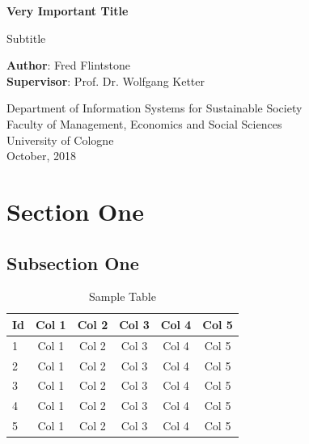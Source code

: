 \documentclass[a4paper]{article}
\begin{document}
\begin{titlepage}
    \begin{center}
        \vspace*{1cm}

        \Large
        \textbf{Very Important Title}

        \vspace{1.5cm}
        Subtitle

        \vspace{8.0cm}

        \large
        \textbf{Author}: Fred Flintstone\\
        \large
        \textbf{Supervisor}: Prof. Dr. Wolfgang Ketter

        \vspace{1cm}
        \large
        Department of Information Systems for Sustainable Society\\
        Faculty of Management, Economics and Social Sciences\\
        University of Cologne\\

        \vspace{1cm}
        October, 2018

    \end{center}
\end{titlepage}

\tableofcontents
\clearpage
\listoffigures
\clearpage
\listoftables
\clearpage


\section{Section One}
\subsection{Subsection One}
\begin{longtable}{l|ccccc}
\caption{Sample Table}
\label{table:table-1}
\\
\hline
\hline
Id & Col 1 & Col 2 & Col 3 & Col 4 & Col 5\\
\hline
1 & Col 1 & Col 2 & Col 3 & Col 4 & Col 5\\
2 & Col 1 & Col 2 & Col 3 & Col 4 & Col 5\\
3 & Col 1 & Col 2 & Col 3 & Col 4 & Col 5\\
4 & Col 1 & Col 2 & Col 3 & Col 4 & Col 5\\
5 & Col 1 & Col 2 & Col 3 & Col 4 & Col 5\\
\hline
\hline
\end{longtable}
\end{document}
